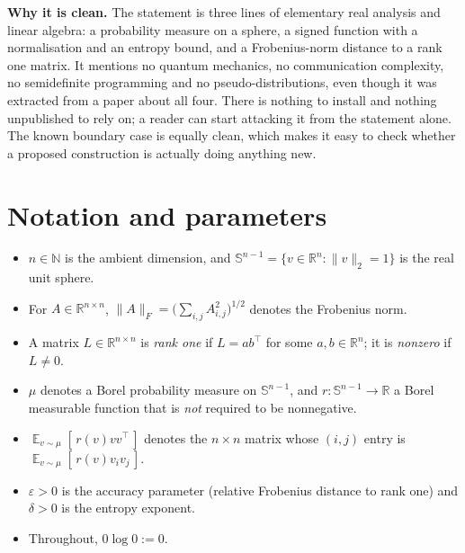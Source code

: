 \documentclass{aicr-conjecture}
\newcommand{\Expect}{\operatorname*{\mathbb{E}}}
\newcommand{\Sph}{\mathbb{S}^{n-1}}
\newcommand{\Reals}{\mathbb{R}}
\newcommand{\Nat}{\mathbb{N}}
\begin{document}
\textbf{Why it is clean.} The statement is three lines of elementary
real analysis and linear algebra: a probability measure on a sphere, a
signed function with a normalisation and an entropy bound, and a
Frobenius-norm distance to a rank one matrix. It mentions no quantum
mechanics, no communication complexity, no semidefinite programming
and no pseudo-distributions, even though it was extracted from a paper
about all four. There is nothing to install and nothing unpublished to
rely on; a reader can start attacking it from the statement alone. The
known boundary case is equally clean, which makes it easy to check
whether a proposed construction is actually doing anything new.

\section{Notation and parameters}\label{sec:notation}

\begin{itemize}[leftmargin=1.2em]
\item $n \in \Nat$ is the ambient dimension, and $\Sph = \{ v \in
  \Reals^{n} : \|v\|_{2} = 1 \}$ is the real unit sphere.
\item For $A \in \Reals^{n \times n}$, $\|A\|_{F} = \big(\sum_{i,j}
  A_{i,j}^{2}\big)^{1/2}$ denotes the Frobenius norm.
\item A matrix $L \in \Reals^{n \times n}$ is \emph{rank one} if $L =
  a b^{\top}$ for some $a, b \in \Reals^{n}$; it is \emph{nonzero} if
  $L \neq 0$.
\item $\mu$ denotes a Borel probability measure on $\Sph$, and $r :
  \Sph \to \Reals$ a Borel measurable function that is \emph{not}
  required to be nonnegative.
\item $\Expect_{v \sim \mu}[\, r(v) v v^{\top} \,]$ denotes the $n
  \times n$ matrix whose $(i,j)$ entry is $\Expect_{v \sim \mu}[\,
  r(v) v_{i} v_{j} \,]$.
\item $\varepsilon > 0$ is the accuracy parameter (relative Frobenius
  distance to rank one) and $\delta > 0$ is the entropy exponent.
\item Throughout, $0 \log 0 := 0$.
\end{itemize}
\end{document}
